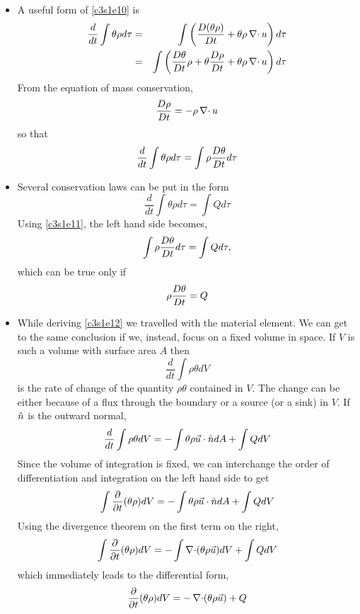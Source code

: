 \begin{itemize}
\item A useful form of \eqref{c3s1e10} is
\begin{eqnarray*}
\frac{d}{dt}\int\theta\rho d\tau &=& \int\left(\frac{D{(\theta\rho)}}{Dt} + \theta\rho\operatorname{\nabla\cdot}{u}\right)d\tau \\
 &=& \int\left(\frac{D{\theta}}{Dt}\rho + \theta\frac{D{\rho}}{Dt} + \theta\rho\operatorname{\nabla\cdot}{u}\right)d\tau \\
\end{eqnarray*}
From the equation of mass conservation,
\[
\frac{D{\rho}}{Dt} = -\rho\operatorname{\nabla\cdot}{u}
\]
so that
\begin{equation}\label{c3s1e11}
\frac{d}{dt}\int\theta\rho d\tau = \int\rho\frac{D{\theta}}{Dt}d\tau
\end{equation}

\item Several conservation laws can be put in the form
\[
\frac{d}{dt}\int\theta\rho d\tau = \int Q d\tau
\]
Using \eqref{c3s1e11}, the left hand side becomes,
\[
\int\rho\frac{D{\theta}}{Dt}d\tau = \int Qd\tau,
\]
which can be true only if
\begin{equation}\label{c3s1e12}
\rho\frac{D{\theta}}{Dt} = Q
\end{equation}

\item While deriving \eqref{c3s1e12} we travelled with the material element. We can get to the same conclusion if we, instead, focus on a fixed volume in space. If $V$ is such a volume
with surface area $A$ then
\[
\frac{d}{dt}\int\rho\theta dV
\]
is the rate of change of the quantity $\rho\theta$ contained in $V$. The change can be either because of a flux through the boundary or a source (or a sink) in $V$. If $\hat{n}$ is the
outward normal,
\[
\frac{d}{dt}\int\rho\theta dV = -\int\theta\rho\vec{u}\cdot\hat{n} dA + \int QdV
\]
Since the volume of integration is fixed, we can interchange the order of differentiation and integration on the left hand side to get
\[
\int\frac{\partial}{\partial t} (\theta\rho) dV = -\int\theta\rho\vec{u}\cdot\hat{n} dA + \int QdV
\]
Using the divergence theorem on the first term on the right,
\begin{equation}\label{c3s1e13}
\int\frac{\partial}{\partial t} (\theta\rho) dV = -\int\operatorname{\nabla\cdot}(\theta\rho\vec{u})dV + \int QdV
\end{equation}
which immediately leads to the differential form,
\begin{equation}\label{c3s1e14}
\frac{\partial}{\partial t} (\theta\rho) dV = -\operatorname{\nabla\cdot}(\theta\rho\vec{u}) + Q
\end{equation}
\end{itemize}

